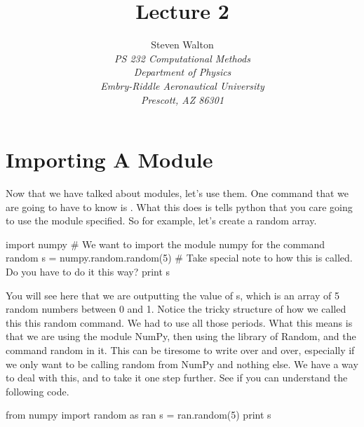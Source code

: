 \documentclass[11pt]{article}   %
\title{Lecture 2}
\author{Steven Walton\\     %
\textit{PS 232 Computational Methods}\\
\textit{Department of Physics}\\
\textit{Embry-Riddle Aeronautical University}\\
\textit{Prescott, AZ   86301}}
\begin{document}
\maketitle

\section*{Importing A Module}
Now that we have talked about modules, let's use them. One command that we are going to have to know is .
What this does is tells python that you care going to use the module specified.  So for example, let's create a random array.
\begin{tcolorbox}
   import numpy                  $\#$ We want to import the module numpy for the command random
   s = numpy.random.random(5)    $\#$ Take special note to how this is called.  Do you have to do it this way?
   print s           
\end{tcolorbox}


You will see here that we are outputting the value of s, which is an array of 5 random numbers between 0 and 1.
Notice the tricky structure of how we called this this random command.  We had to use all those periods.  What this means
is that we are using the module NumPy, then using the library of Random, and the command random in it. This can be
tiresome to write over and over, especially if we only want to be calling random from NumPy and nothing else.  We have
a way to deal with this, and to take it one step further.  See if you can understand the following code.
\begin{tcolorbox}
   from numpy import random as ran
   s = ran.random(5)
   print s
\end{tcolorbox}
\end{document}
